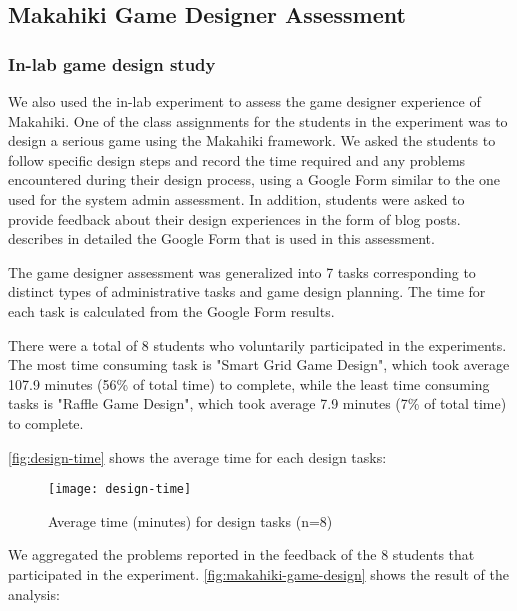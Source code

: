 
\subsection{Makahiki Game Designer Assessment}

\subsubsection{In-lab game design study}

We also used the in-lab experiment to assess the game
designer experience of Makahiki. One of the class assignments for the students in the
experiment was to design a serious game using the Makahiki framework. We asked the students
to follow specific design steps and record the time required and any problems encountered during
their design process, using a Google Form similar to the one used for the system admin
assessment. In addition, students were asked to provide feedback about their
design experiences in the form of blog posts. \cite{csdl2-13-04} describes in detailed
the Google Form that is used in this assessment.

The game designer assessment was generalized into 7 tasks corresponding to
distinct types of administrative tasks and game design planning. The time for each task is
calculated from the Google Form results.  

There were a total of 8 students who voluntarily participated in the experiments. The most time consuming task is "Smart Grid Game Design", which took average 107.9 minutes (56\% of total time) to complete, while the least time consuming tasks is "Raffle Game Design", which took average 7.9 minutes (7\% of total time) to complete.

\autoref{fig:design-time} shows the average time for each design tasks:

\begin{figure}[ht!]
  \center
  \texttt{[image: design-time]}
  \caption{Average time (minutes) for design tasks (n=8)}
  \label{fig:design-time}
\end{figure}

 We aggregated the problems reported in the feedback of the 8 students that participated in the experiment.
\autoref{fig:makahiki-game-design} shows the result of the analysis:

